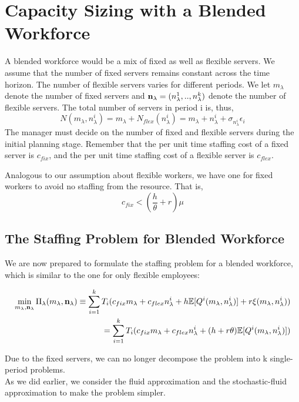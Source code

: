 \chapter{Capacity Sizing with a Blended Workforce}
A blended workforce would be a mix of fixed as well as flexible servers. We assume that the number of fixed servers remains constant across the time horizon. The number of flexible servers varies for different periods. We let $m_{\lambda}$ denote the number of fixed servers and $\bold{n}_{\lambda} = (n_{\lambda}^1,..,n_{\lambda}^k)$ denote the number of flexible servers. The total number of servers in period i is, thus, 
\[N(m_{\lambda},n_{\lambda}^i) = m_{\lambda} +N_{flex}(n_{\lambda}^i) = m_{\lambda} + n_{\lambda}^i + \sigma_{n_{\lambda}^i}\epsilon_i\]
The manager must decide on the number of fixed and flexible servers during the initial planning stage. Remember that the per unit time staffing cost of a fixed server is $c_{fix}$, and the per unit time staffing cost of a flexible server is $c_{flex}$.
\begin{remark}
Analogous to our assumption about flexible workers, we have one for fixed workers to avoid no staffing from the resource. That is, \[c_{fix} < (\frac{h}{\theta} + r)\mu\]
\end{remark}

\section{The Staffing Problem for Blended Workforce}
We are now prepared to formulate the staffing problem for a blended workforce, which is similar to the one for only flexible employees:

\begin{equation}
\begin{aligned}
\min_{m_{\lambda},\bold{n}_{\lambda}} \Pi_{\lambda}(m_{\lambda},\bold{n}_{\lambda}) \equiv \sum_{i=1}^{k} T_i(c_{fix}m_{\lambda} + c_{flex}n_{\lambda}^i + h\mathbb{E}[Q^i(m_{\lambda},n_{\lambda}^i)] + r\xi(m_{\lambda},n_{\lambda}^i)) \\
= \sum_{i=1}^{k} T_i(c_{fix}m_{\lambda} + c_{flex}n_{\lambda}^i + (h+r\theta)\mathbb{E}[Q^i(m_{\lambda},n_{\lambda}^i)])
\end{aligned}
\end{equation}

Due to the fixed servers, we can no longer decompose the problem into k single-period problems.\\ As we did earlier, we consider the 
fluid approximation and the stochastic-fluid approximation to make the problem simpler. \\

